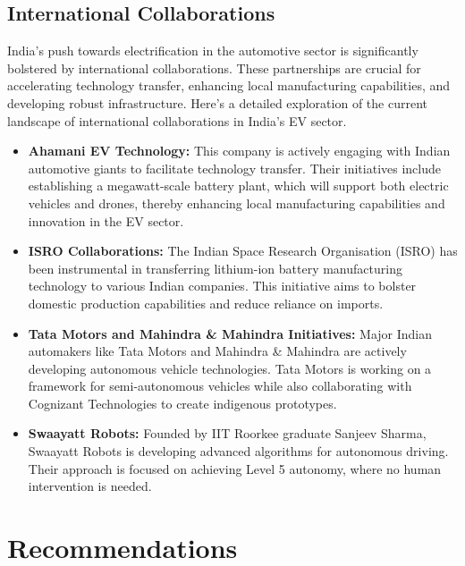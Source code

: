 \documentclass[a4paper,12pt]{report}
\begin{document}
\section{International Collaborations}
India's push towards electrification in the automotive sector is significantly bolstered by international collaborations. These partnerships are crucial for accelerating technology transfer, enhancing local manufacturing capabilities, and developing robust infrastructure. Here’s a detailed exploration of the current landscape of international collaborations in India's EV sector.
\begin{itemize}
    \item \textbf{Ahamani EV Technology: }
    This company is actively engaging with Indian automotive giants to facilitate technology transfer. Their initiatives include establishing a megawatt-scale battery plant, which will support both electric vehicles and drones, thereby enhancing local manufacturing capabilities and innovation in the EV sector.
    \item \textbf{ISRO Collaborations: }
    The Indian Space Research Organisation (ISRO) has been instrumental in transferring lithium-ion battery manufacturing technology to various Indian companies. This initiative aims to bolster domestic production capabilities and reduce reliance on imports.
    \item \textbf{Tata Motors and Mahindra \& Mahindra Initiatives: }
    Major Indian automakers like Tata Motors and Mahindra \& Mahindra are actively developing autonomous vehicle technologies. Tata Motors is working on a framework for semi-autonomous vehicles while also collaborating with Cognizant Technologies to create indigenous prototypes.
    \item \textbf{Swaayatt Robots: }
    Founded by IIT Roorkee graduate Sanjeev Sharma, Swaayatt Robots is developing advanced algorithms for autonomous driving. Their approach is focused on achieving Level 5 autonomy, where no human intervention is needed.
\end{itemize}

\chapter{Recommendations}
\end{document}
